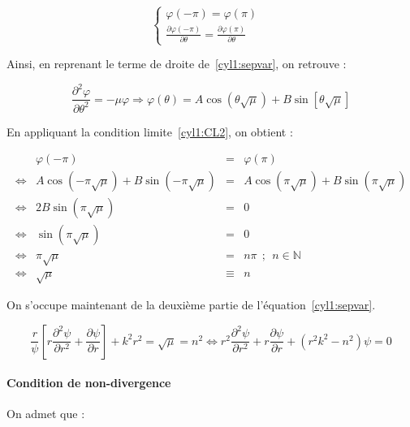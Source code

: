 \documentclass[11pt]{article}
\renewcommand{\phi}\varphi
\begin{document}
\begin{equation}
\begin{cases}
    \phi(-\pi) = \phi(\pi)&\\
    \frac{\partial\phi(-\pi)}{\partial \theta} = \frac{\partial\phi(\pi)}{\partial \theta}&
\end{cases}\label{cyl1:CL2}
\end{equation}

Ainsi, en reprenant le terme de droite de~\eqref{cyl1:sepvar}, on retrouve :

\begin{equation}
    \frac{\partial^2\phi}{\partial\theta^2} = - \mu\phi \Rightarrow \phi(\theta) = A\cos(\theta\sqrt{\mu}) +
    B\sin[\theta\sqrt{\mu}] \label{cyl1:eq_phi}
\end{equation}

En appliquant la condition limite~\eqref{cyl1:CL2}, on obtient :

\begin{equation}
    \begin{array}{rrcl}
        &\phi(-\pi) & = & \phi(\pi)\\
        \Leftrightarrow & A\cos(-\pi\sqrt{\mu}) + B\sin(-\pi\sqrt{\mu}) & = & A\cos(\pi\sqrt{\mu}) + B\sin(\pi\sqrt{\mu}) \\
        \Leftrightarrow & 2B\sin(\pi\sqrt{\mu}) & = & 0\\
        \Leftrightarrow & \sin(\pi\sqrt{\mu}) & = & 0\\
        \Leftrightarrow & \pi\sqrt{\mu} & = & n\pi ~~;~~ n\in\mathbb{N}\\
        \Leftrightarrow & \sqrt{\mu} & \equiv & n
    \end{array}        
\end{equation}

On s'occupe maintenant de la deuxième partie de l'équation~\eqref{cyl1:sepvar}.

\begin{equation}
    \frac{r}{\psi}\left[r\frac{\partial^2\psi}{\partial r^2}+\frac{\partial\psi}{\partial r}\right] + k^2r^2 =
    \sqrt{\mu} = n^2 \Leftrightarrow r^2\frac{\partial^2\psi}{\partial r^2} + r\frac{\partial\psi}{\partial r} +
    (r^2k^2-n^2)\psi = 0 \label{cyl1:eq_psi}
\end{equation}

\paragraph{Condition de non-divergence} On admet que :
\end{document}
